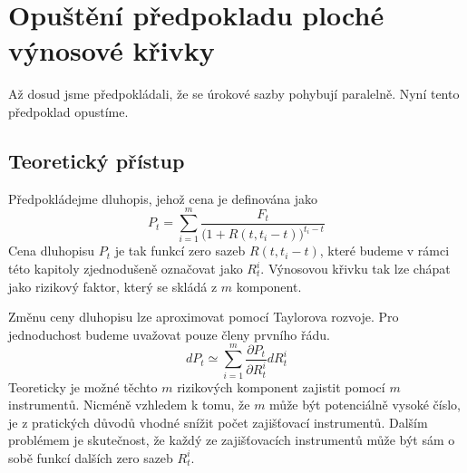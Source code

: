 \documentclass[a4paper]{book}
\begin{document}
\section{Opuštění předpokladu ploché výnosové křivky}

Až dosud jsme předpokládali, že se úrokové sazby pohybují paralelně. Nyní tento předpoklad opustíme.

\subsection{Teoretický přístup}

Předpokládejme dluhopis, jehož cena je definována jako
\begin{equation*}
P_t = \sum_{i=1}^m \frac{F_t}{\Big(1 + R(t, t_i - t) \Big)^{t_i - t}}
\end{equation*}
Cena dluhopisu $P_t$ je tak funkcí zero sazeb $R(t, t_i - t)$, které budeme v rámci této kapitoly zjednodušeně označovat jako $R_t^i$. Výnosovou křivku tak lze chápat jako rizikový faktor, který se skládá z $m$ komponent.

Změnu ceny dluhopisu lze aproximovat pomocí Taylorova rozvoje. Pro jednoduchost budeme uvažovat pouze členy prvního řádu.
\begin{equation*}
d P_t \simeq \sum_{i=1}^m \frac{\partial P_t}{\partial R_t^i}dR_t^i
\end{equation*}
Teoreticky je možné těchto $m$ rizikových komponent zajistit pomocí $m$ instrumentů. Nicméně vzhledem k tomu, že $m$ může být potenciálně vysoké číslo, je z pratických důvodů vhodné snížit počet zajišťovací instrumentů. Dalším problémem je skutečnost, že každý ze zajišťovacích instrumentů může být sám o sobě funkcí dalších zero sazeb $R_t^i$.
\end{document}
